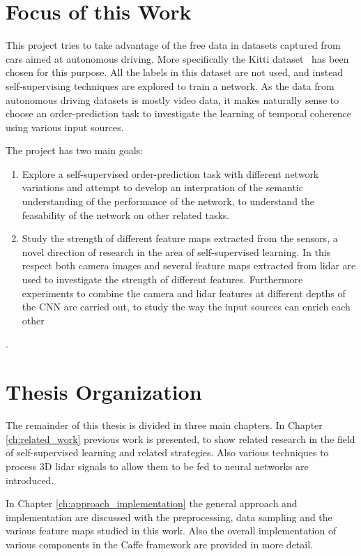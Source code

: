 \section{Focus of this Work}
This project tries to take advantage of the free data in datasets captured from cars aimed at autonomous driving. More specifically the Kitti dataset~\cite{geiger2012} has been chosen for this purpose. All the labels in this dataset are not used, and instead self-supervising techniques are explored to train a network. As the data from autonomous driving datasets is mostly video data, it makes naturally sense to choose an order-prediction task to investigate the learning of temporal coherence using various input sources.

The project has two main goals:
\begin{enumerate}
\item Explore a self-supervised order-prediction task with different network variations and attempt to develop an interpration of the semantic understanding of the performance of the network, to understand the feasability of the network on other related tasks.
\item Study the strength of different feature maps extracted from the sensors, a novel direction of research in the area of self-supervised learning. In this respect both camera images and several feature maps extracted from lidar are used to investigate the strength of different features. Furthermore experiments to combine the camera and lidar features at different depths of the CNN are carried out, to study the way the input sources can enrich each other
\end{enumerate}.

\section{Thesis Organization}
The remainder of this thesis is divided in three main chapters. In Chapter \ref{ch:related_work} previous work is presented, to show related research in the field of self-supervised learning and related strategies. Also various techniques to process 3D lidar signals to allow them to be fed to neural networks are introduced. 

In Chapter \ref{ch:approach_implementation} the general approach and implementation are discussed with the preprocessing, data sampling and the various feature maps studied in this work. Also the overall implementation of various components in the Caffe framework are provided in more detail. 

